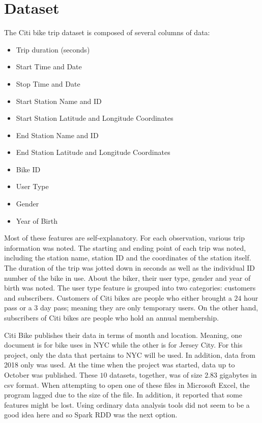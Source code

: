 \documentclass{article}
\begin{document}
\section{Dataset} 
The Citi bike trip dataset is composed of several columns of data: 
\begin{multicols}{2} \begin{itemize} 
\item Trip duration (seconds)
\item Start Time and Date
\item Stop Time and Date
\item Start Station Name and ID
\item Start Station Latitude and Longitude Coordinates 
\item End Station Name and ID
\item End Station Latitude and Longitude Coordinates 
\item Bike ID
\item User Type 
\item Gender 
\item Year of Birth \end{itemize} \end{multicols} 
Most of these features are self-explanatory. For each observation, various trip information was noted. The starting and ending point of each trip was noted, including the station name, station ID and the coordinates of the station itself. The duration of the trip was jotted down in seconds as well as the individual ID number of the bike in use. About the biker, their user type, gender and year of birth was noted. The user type feature is grouped into two categories: customers and subscribers. Customers of Citi bikes are people who either brought a $24$ hour pass or a $3$ day pass; meaning they are only temporary users. On the other hand, subscribers of Citi bikes are people who hold an annual membership. 

Citi Bike publishes their data in terms of month and location. Meaning, one document is for bike uses in NYC while the other is for Jersey City. For this project, only the data that pertains to NYC will be used. In addition, data from 2018 only was used. At the time when the project was started, data up to October was published. These $10$ datasets, together, was of size $2.83$ gigabytes in csv format. When attempting to open one of these files in Microsoft Excel, the program lagged due to the size of the file. In addition, it reported that some features might be lost. Using ordinary data analysis tools did not seem to be a good idea here and so Spark RDD was the next option. 
\end{document}

